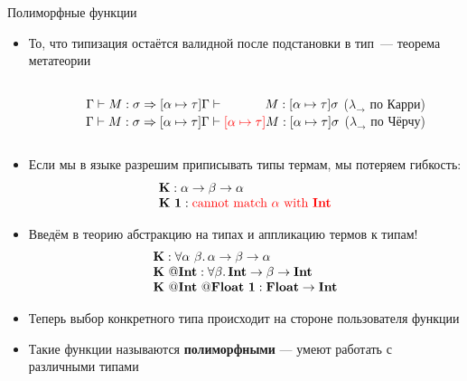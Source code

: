     \begin{frame}{Полиморфные функции \advancedslide}
        \vspace{-0.5em}
        \begin{itemize}
            \item[\advanced] То, что типизация остаётся валидной после подстановки в тип~--- теорема метатеории
            \vspace{-1.3em}
            \begin{columns}[onlytextwidth]
                \begin{column}[t]{0.05\textwidth}
                \end{column}\hfill%
                \begin{column}[t]{0.95\textwidth}
                    \begin{theorem}
                        $\Gamma\vdash M : \sigma \Rightarrow [\alpha\mapsto\tau]\Gamma\vdash \hspace{3.25em}M : [\alpha\mapsto\tau]\sigma$ {\color{blue} ($\lambda_{\rightarrow}$ по Карри)}
                        \\
                        $\Gamma\vdash M : \sigma \Rightarrow [\alpha\mapsto\tau]\Gamma\vdash {\color{red} [\alpha\mapsto\tau]}M : [\alpha\mapsto\tau]\sigma$ {\color{red} ($\lambda_{\rightarrow}$ по Чёрчу)}
                    \end{theorem}
                \end{column}
            \end{columns}
            \vspace{0.3em}
            \item Если мы в языке разрешим приписывать типы термам, мы потеряем гибкость:
            \[
                \begin{array}{l}
                    \mathbf{K} : \alpha \to \beta \to \alpha \\
                    \mathbf{K} ~ \mathbf{1} : {\color{red}\text{cannot match } \alpha \text{ with } \mathbf{Int}}
                \end{array}
            \]
            \item Введём в теорию абстракцию на типах и аппликацию термов к типам!
            \[
                \begin{array}{l}
                    \mathbf{K} : \forall \alpha ~ \beta \ldotp \alpha \to \beta \to \alpha
                    \\
                    \mathbf{K} ~ @\mathbf{Int} : \forall \beta \ldotp \mathbf{Int} \to \beta \to \mathbf{Int}
                    \\
                    \mathbf{K} ~ @\mathbf{Int} ~ @\mathbf{Float} ~ \mathbf{1} : \mathbf{Float} \to \mathbf{Int}
                \end{array}
            \]
            \item Теперь выбор конкретного типа происходит на стороне пользователя функции
            \item Такие функции называются \textbf{полиморфными} --- умеют работать с различными типами
        \end{itemize}
    \end{frame}

